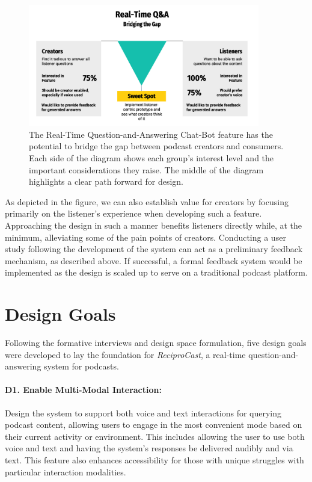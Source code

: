 \documentclass[12pt]{report}
\begin{document}
\begin{myfont}
        \begin{figure}[H]
            \centering
              \includegraphics[width=0.9\textwidth]{figures/bridging_the_gap.png}
              \caption{The Real-Time Question-and-Answering Chat-Bot feature has the potential to bridge the gap between podcast creators and consumers. Each side of the diagram shows each group's interest level and the important considerations they raise. The middle of the diagram highlights a clear path forward for design.}
              \label{fig:bridging_the_gap}
        \end{figure}

        As depicted in the figure, we can also establish value for creators by focusing primarily on the listener's experience when developing such a feature. Approaching the design in such a manner benefits listeners directly while, at the minimum, alleviating some of the pain points of creators. Conducting a user study following the development of the system can act as a preliminary feedback mechanism, as described above. If successful, a formal feedback system would be implemented as the design is scaled up to serve on a traditional podcast platform.
        
        \section{Design Goals}
        Following the formative interviews and design space formulation, five design goals were developed to lay the foundation for \textit{ReciproCast}, a real-time question-and-answering system for podcasts. 
        
        \paragraph{D1. Enable Multi-Modal Interaction:} Design the system to support both voice and text interactions for querying podcast content, allowing users to engage in the most convenient mode based on their current activity or environment. This includes allowing the user to use both voice and text and having the system's responses be delivered audibly and via text. This feature also enhances accessibility for those with unique struggles with particular interaction modalities. 


\end{myfont}
\end{document}
